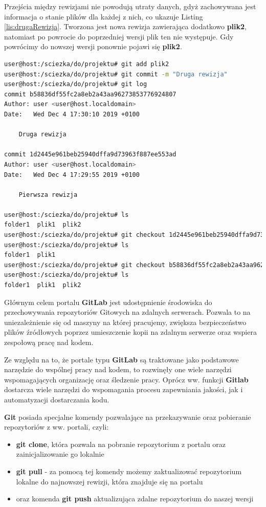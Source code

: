 Przejścia między rewizjami nie powodują utraty danych, gdyż zachowywana jest informacja o stanie plików dla każdej z nich, co ukazuje Listing \ref{lis:drugaRewizja}. Tworzona jest nowa rewizja zawierająca dodatkowo \textbf{plik2}, natomiast po powrocie do poprzedniej wersji plik ten nie występuje. Gdy powrócimy do nowszej wersji ponownie pojawi się \textbf{plik2}.

\begin{lstlisting}[language=bash,caption={Podsumowanie rewizji, powrót do starszej wersji},label={lis:drugaRewizja}]
user@host:/sciezka/do/projektu# git add plik2
user@host:/sciezka/do/projektu# git commit -m "Druga rewizja"
user@host:/sciezka/do/projektu# git log 
commit b58836df55fc2a8eb2a43aa96273853776924807
Author: user <user@host.localdomain>
Date:   Wed Dec 4 17:30:10 2019 +0100

    Druga rewizja

commit 1d2445e961beb25940dffa9d73963f887ee553ad
Author: user <user@host.localdomain>
Date:   Wed Dec 4 17:29:55 2019 +0100

    Pierwsza rewizja

user@host:/sciezka/do/projektu# ls
folder1  plik1  plik2
user@host:/sciezka/do/projektu# git checkout 1d2445e961beb25940dffa9d73963f887ee553ad
user@host:/sciezka/do/projektu# ls
folder1  plik1
user@host:/sciezka/do/projektu# git checkout b58836df55fc2a8eb2a43aa96273853776924807
user@host:/sciezka/do/projektu# ls
folder1  plik1  plik2
\end{lstlisting}

Głównym celem portalu \textbf{GitLab} jest udostępnienie środowiska do przechowywania repozytoriów Gitowych na zdalnych serwerach. Pozwala to na uniezależnienie się od maszyny na której pracujemy, zwiększa bezpieczeństwo plików źródłowych poprzez umieszczenie kopii na zdalnym serwerze oraz wspiera zespołową pracę nad kodem.\par

Ze względu na to, że portale typu \textbf{GitLab} są traktowane jako podstawowe narzędzie do wspólnej pracy nad kodem, to rozwinęły one wiele narzędzi wspomagających organizację oraz śledzenie pracy. Oprócz ww. funkcji \textbf{Gitlab} dostarcza wiele narzędzi do wspomagania procesu zapewniania jakości, jak i automatyzacji dostarczania kodu.\par

\textbf{Git} posiada specjalne komendy pozwalające na przekazywanie oraz pobieranie repozytoriów z ww. portali, czyli:
\begin{itemize}
\item \textbf{git clone}, która pozwala na pobranie repozytorium z portalu oraz zainicjalizowanie go lokalnie
\item \textbf{git pull} - za pomocą tej komendy możemy zaktualizować repozytorium lokalne do najnowszej rewizji, która znajduje się na portalu
\item oraz komenda \textbf{git push} aktualizująca zdalne repozytorium do naszej wersji
\end{itemize}

